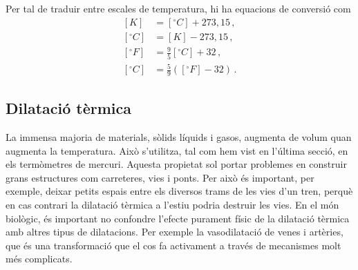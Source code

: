 \documentclass[12pt]{book}
\begin{document}
Per tal de traduir entre escales de temperatura, hi ha equacions de conversió com
%
\begin{equation}
\begin{split}
    [K] &= [^\circ C] + 273,15\, , \\
    [^\circ C] &= [K] - 273,15\, , \\
    [^\circ F] &= \frac{9}{5} [^\circ C] + 32\, , \\
    [^\circ C] &= \frac{5}{9} \left([^\circ F] - 32\right)\, .
\end{split}
\end{equation}

\subsection{Dilatació tèrmica}

La immensa majoria de materials, sòlids líquids i gasos, augmenta de volum quan augmenta la temperatura. Això s'utilitza, tal com hem vist en l'última secció, en els termòmetres de mercuri. Aquesta propietat sol portar problemes en construir grans estructures com carreteres, vies i ponts. Per això és important, per exemple, deixar petits espais entre els diversos trams de les vies d'un tren, perquè en cas contrari la dilatació tèrmica a l'estiu podria destruir les vies. En el món biològic, és important no confondre l'efecte purament físic de la dilatació tèrmica amb altres tipus de dilatacions. Per exemple la vasodilatació de venes i artèries, que és una transformació que el cos fa activament a través de mecanismes molt més complicats.
\end{document}
